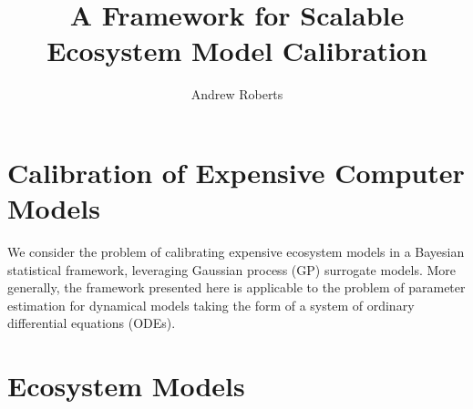 \documentclass[12pt]{article}
\title{A Framework for Scalable Ecosystem Model Calibration}
\author{Andrew Roberts}
\begin{document}
\maketitle
\tableofcontents
\newpage

\section{Calibration of Expensive Computer Models}
We consider the problem of calibrating expensive ecosystem models in a Bayesian statistical framework, leveraging 
Gaussian process (GP) surrogate models. More generally, the framework presented here is applicable to the problem of parameter 
estimation for dynamical models taking the form of a system of ordinary differential equations (ODEs). 

\section{Ecosystem Models}
\end{document}
